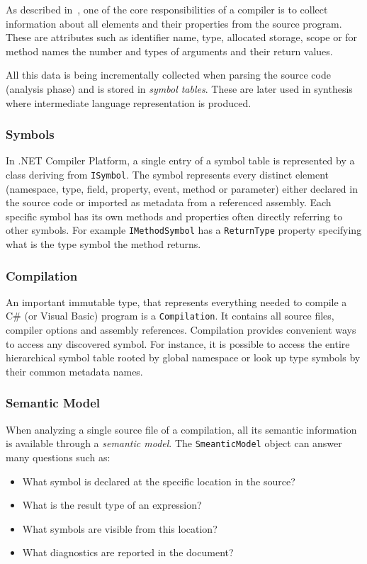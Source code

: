 \documentclass[
  digital, %
  table,   %
  lof,     %
  lot,     %
  oneside,
]{fithesis3}
\begin{document}
As described in~\cite{dragon-book}, one of the core responsibilities of a compiler is to collect information about all elements and their properties from the source program. These are attributes such as identifier name, type, allocated storage, scope or for method names the number and types of arguments and their return values.

All this data is being incrementally collected when parsing the source code (analysis phase) and is stored in \textit{symbol tables}. These are later used in synthesis where intermediate language representation is produced.

\subsubsection{Symbols}
In .NET Compiler Platform, a single entry of a symbol table is represented by a class deriving from \texttt{ISymbol}. The symbol represents every distinct element (namespace, type, field, property, event, method or parameter) either declared in the source code or imported as metadata from a referenced assembly. Each specific symbol has its own methods and properties often directly referring to other symbols. For example \texttt{IMethodSymbol} has a \texttt{ReturnType} property specifying what is the type symbol the method returns.

\subsubsection{Compilation}
An important immutable type, that represents everything needed to compile a C\# (or Visual Basic) program is a \texttt{Compilation}. It contains all source files, compiler options and assembly references. Compilation provides convenient ways to access any discovered symbol. For instance, it is possible to access the entire hierarchical symbol table rooted by global namespace or look up type symbols by their common metadata names.

\subsubsection{Semantic Model}
When analyzing a single source file of a compilation, all its semantic information is available through a \textit{semantic model}. The \texttt{SmeanticModel} object can answer many questions such as:
  \begin{itemize}
  \item What symbol is declared at the specific location in the source?
  \item What is the result type of an expression?
  \item What symbols are visible from this location?
  \item What diagnostics are reported in the document?
  \end{itemize}
 
\end{document}
